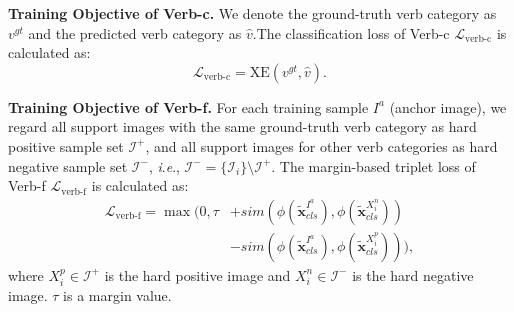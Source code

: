 \documentclass[letterpaper]{article} %
\newcommand{\ie}{\textit{i}.\textit{e}.}
\begin{document}
\noindent\textbf{Training Objective of Verb-c.}
We denote the ground-truth verb category as $v^{gt}$ and the predicted verb category as $\hat{v}$.The classification loss of Verb-c $\mathcal{L}_{\text{verb-c}}$ is calculated as:
\begin{equation}
    \mathcal{L}_{\text{verb-c}} = \text{XE}(v^{gt}, \hat{v}).
\end{equation}

\noindent\textbf{Training Objective of Verb-f.}
For each training sample $I^a$ (anchor image), we regard all support images with the same ground-truth verb category as hard positive sample set $\mathcal{I}^+$, and all support images for other verb categories as hard negative sample set $\mathcal{I}^-$, \ie, $\mathcal{I}^- = \{\mathcal{I}_i\}\setminus \mathcal{I}^+$. The margin-based triplet loss of Verb-f $\mathcal{L}_{\text{verb-f}}$ is calculated as:
\begin{equation}
\begin{aligned}
    \mathcal{L}_{\text{verb-f}} = \max (0, \tau & +  sim(\phi(\tilde{\bm{x}}_{cls}^{I^{a}}),
    \phi (\tilde{\bm{x}}_{cls}^{X_{i}^{n}}))  \\
    & - sim(\phi(\tilde{\bm{x}}_{cls}^{I^{a}}), \phi (\tilde{\bm{x}}_{cls}^{X_{i}^{p}}))),
\end{aligned}
\end{equation}
where $X_{i}^{p} \in \mathcal{I}^{+} $ is the hard positive image and  $X_{i}^{n} \in \mathcal{I}^{-} $ is the hard negative image. $\tau$ is a margin value.
\end{document}
